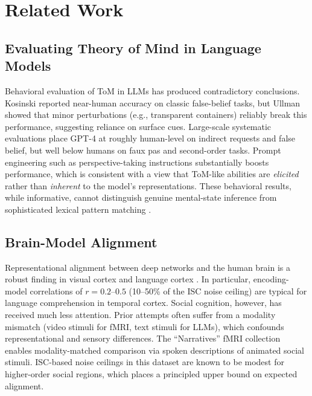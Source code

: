 \documentclass[conference]{IEEEtran}
\begin{document}
\section{Related Work}

\subsection{Evaluating Theory of Mind in Language Models}

Behavioral evaluation of ToM in LLMs has produced contradictory conclusions. Kosinski \cite{kosinski2024evaluating} reported near-human accuracy on classic false-belief tasks, but Ullman \cite{ullman2023large} showed that minor perturbations (e.g., transparent containers) reliably break this performance, suggesting reliance on surface cues. Large-scale systematic evaluations \cite{strachan2024testing, chen2024tombench} place GPT-4 at roughly human-level on indirect requests and false belief, but well below humans on faux pas and second-order tasks. Prompt engineering such as perspective-taking instructions \cite{wilf2024think} substantially boosts performance, which is consistent with a view that ToM-like abilities are \emph{elicited} rather than \emph{inherent} to the model's representations. These behavioral results, while informative, cannot distinguish genuine mental-state inference from sophisticated lexical pattern matching \cite{sap2022neural, marcus2023large}.

\subsection{Brain-Model Alignment}

Representational alignment between deep networks and the human brain is a robust finding in visual cortex \cite{khaligh2014deep} and language cortex \cite{schrimpf2021neural, caucheteux2022brains, goldstein2022shared}. In particular, encoding-model correlations of $r=0.2$--$0.5$ (10--50\% of the ISC noise ceiling) are typical for language comprehension in temporal cortex. Social cognition, however, has received much less attention. Prior attempts often suffer from a modality mismatch (video stimuli for fMRI, text stimuli for LLMs), which confounds representational and sensory differences. The ``Narratives'' fMRI collection \cite{nastase2021narratives} enables modality-matched comparison via spoken descriptions of animated social stimuli. ISC-based noise ceilings in this dataset are known to be modest for higher-order social regions, which places a principled upper bound on expected alignment.
\end{document}
